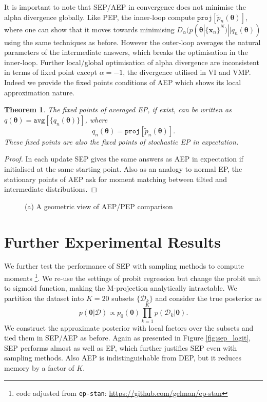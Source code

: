\documentclass{article} %
\newtheorem{theorem}{Theorem}
\begin{document}
It is important to note that SEP/AEP in convergence does not minimise the alpha divergence globally. Like PEP, the inner-loop compute $\mathtt{proj}[\tilde{p}_n(\bm{\theta})]$, where one can show that it moves towards minimising $D_{\alpha}(p(\bm{\theta} | \{\bm{x}_n\}^N) || q_n(\bm{\theta}))$ using the same techniques as before. However the outer-loop averages the natural parameters of the intermediate answers, which breaks the optimisation in the inner-loop. Further local/global optimisation of alpha divergence are inconsistent in terms of fixed point except $\alpha = -1$, the divergence utilised in VI and VMP. Indeed we provide the fixed points conditions of AEP which shows its local approximation nature.
%
\begin{theorem}
The fixed points of averaged EP, if exist, can be written as $q(\bm{\theta}) = \mathtt{avg}[\{q_n(\bm{\theta})\}]$, where
\begin{equation}
q_n(\bm{\theta}) = \mathtt{proj}[\tilde{p}_n(\bm{\theta})].
\label{eq:mm}
\end{equation}
These fixed points are also the fixed points of stochastic EP in expectation. 
\end{theorem}
\begin{proof}
In each update SEP gives the same answers as AEP in expectation if initialised at the same starting point. Also as an analogy to normal EP, the stationary points of AEP ask for moment matching between tilted and intermediate distributions. 
\end{proof}
%

\begin{figure}
\centering
\def\svgwidth{0.35\linewidth}
\subfigure[\label{fig:aep_vs_pep}]{
}
%
\caption{(a) A geometric view of AEP/PEP comparison}
\end{figure}

\section{Further Experimental Results}
We further test the performance of SEP with sampling methods to compute moments \footnote{code adjusted from \texttt{ep-stan}: \url{https://github.com/gelman/ep-stan}}. We re-use the settings of probit regression but change the probit unit to sigmoid function, making the M-projection analytically intractable. We partition the dataset into $K = 20$ subsets $\{\mathcal{D}_k\}$ and consider the true posterior as
\begin{equation}
p(\bm{\theta}|\mathcal{D}) \propto p_0(\bm{\theta}) \prod_{k=1}^K p(\mathcal{D}_k|\bm{\theta}).
\end{equation}
We construct the approximate posterior with local factors over the subsets and tied them in SEP/AEP as before. Again as presented in Figure \ref{fig:sep_logit}, SEP performs almost as well as EP, which further justifies SEP even with sampling methods. Also AEP is indistinguishable from DEP, but it reduces memory by a factor of $K$.
\end{document}
